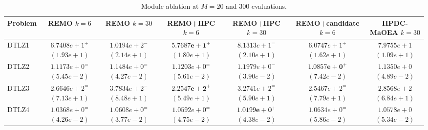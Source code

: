 \documentclass[final,5p,times,twocolumn]{elsarticle}
\begin{document}
\begin{table}[t]
\centering
\caption{Module ablation at $M=20$ and 300 evaluations.}
\label{tab:exp:abl20}
\scriptsize
\setlength{\tabcolsep}{4pt}
\renewcommand{\arraystretch}{1.12}
\begin{tabular}{lcccccc}
\toprule
Problem & \shortstack{REMO\\$k=6$} & \shortstack{REMO\\$k=30$} & \shortstack{REMO+HPC\\$k=6$} & \shortstack{REMO+HPC\\$k=30$} & \shortstack{REMO+candidate\\$k=6$} & \shortstack{HPDC-MaOEA\\$k=30$} \\
\midrule
DTLZ1 & \shortstack{$6.7408e+1^{+}$\\$(1.93e+1)$} & \shortstack{$1.0194e+2^{-}$\\$(2.14e+1)$} & \shortstack{$\mathbf{5.7687e+1}^{+}$\\$(1.80e+1)$} & \shortstack{$8.1313e+1^{=}$\\$(2.10e+1)$} & \shortstack{$6.0747e+1^{+}$\\$(1.62e+1)$} & \shortstack{$7.9755e+1$\\$(1.09e+1)$} \\
DTLZ2 & \shortstack{$1.1173e+0^{=}$\\$(5.45e-2)$} & \shortstack{$1.1484e+0^{=}$\\$(4.27e-2)$} & \shortstack{$1.1203e+0^{=}$\\$(5.61e-2)$} & \shortstack{$1.1979e+0^{-}$\\$(3.90e-2)$} & \shortstack{$\mathbf{1.0857e+0}^{+}$\\$(7.42e-2)$} & \shortstack{$1.1350e+0$\\$(4.89e-2)$} \\
DTLZ3 & \shortstack{$2.6646e+2^{=}$\\$(7.13e+1)$} & \shortstack{$3.7834e+2^{-}$\\$(8.48e+1)$} & \shortstack{$\mathbf{2.2547e+2}^{+}$\\$(5.49e+1)$} & \shortstack{$3.2741e+2^{=}$\\$(5.90e+1)$} & \shortstack{$2.5467e+2^{=}$\\$(7.79e+1)$} & \shortstack{$2.8568e+2$\\$(6.84e+1)$} \\
DTLZ4 & \shortstack{$1.0368e+0^{=}$\\$(4.26e-2)$} & \shortstack{$1.0608e+0^{=}$\\$(3.77e-2)$} & \shortstack{$1.0592e+0^{=}$\\$(4.75e-2)$} & \shortstack{$\mathbf{1.0199e+0}^{+}$\\$(4.38e-2)$} & \shortstack{$1.0634e+0^{=}$\\$(5.86e-2)$} & \shortstack{$1.0578e+0$\\$(5.34e-2)$} \\

\end{tabular}
\end{table}
\end{document}
